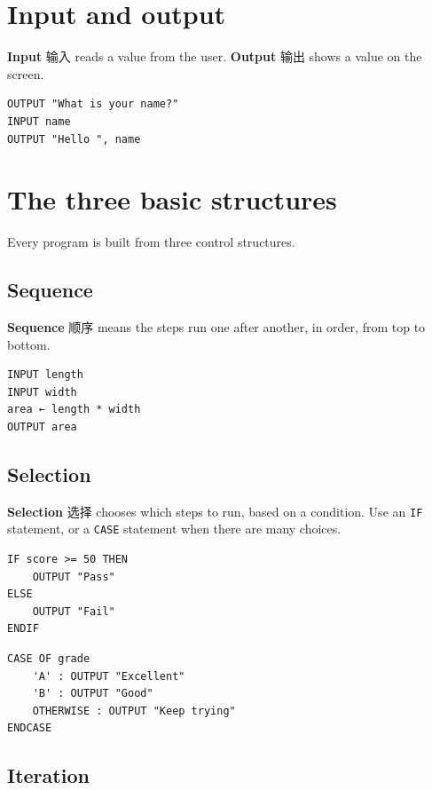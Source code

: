\documentclass[11pt]{article}
\begin{document}
\section*{Input and output}

\textbf{Input} 输入 reads a value from the user. \textbf{Output} 输出 shows a value on the screen.

\begin{Verbatim}
OUTPUT "What is your name?"
INPUT name
OUTPUT "Hello ", name
\end{Verbatim}

\section*{The three basic structures}

Every program is built from three control structures.

\subsection*{Sequence}

\textbf{Sequence} 顺序 means the steps run one after another, in order, from top to bottom.

\begin{Verbatim}
INPUT length
INPUT width
area ← length * width
OUTPUT area
\end{Verbatim}

\subsection*{Selection}

\textbf{Selection} 选择 chooses which steps to run, based on a condition. Use an \texttt{IF} statement, or a \texttt{CASE} statement when there are many choices.

\begin{Verbatim}
IF score >= 50 THEN
    OUTPUT "Pass"
ELSE
    OUTPUT "Fail"
ENDIF
\end{Verbatim}

\begin{Verbatim}
CASE OF grade
    'A' : OUTPUT "Excellent"
    'B' : OUTPUT "Good"
    OTHERWISE : OUTPUT "Keep trying"
ENDCASE
\end{Verbatim}

\subsection*{Iteration}
\end{document}
